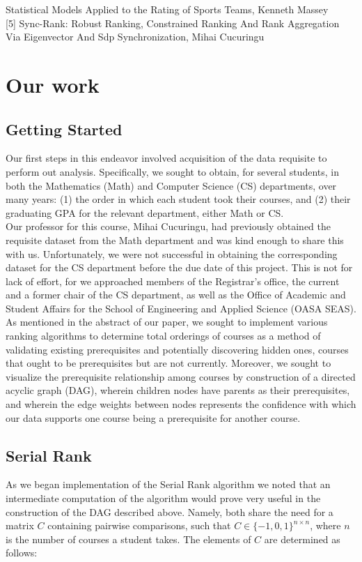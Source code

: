 \documentclass[10pt]{siamltex}
\begin{document}
\begin{pagewiselinenumbers}
[4] Statistical Models Applied to the Rating of Sports Teams, Kenneth Massey\\

[5] Sync-Rank: Robust Ranking, Constrained Ranking And Rank Aggregation Via Eigenvector And Sdp Synchronization, Mihai Cucuringu

\section{Our work}    \label{sec:ourWork}
\subsection{Getting Started}
Our first steps in this endeavor involved acquisition of the data requisite to perform out analysis. Specifically, we sought to obtain, for several students, in both the Mathematics (Math) and Computer Science (CS) departments, over many years: (1) the order in which each student took their courses, and (2) their graduating GPA for the relevant department, either Math or CS.\\

Our professor for this course, Mihai Cucuringu, had previously obtained the requisite dataset from the Math department and was kind enough to share this with us. Unfortunately, we were not successful in obtaining the corresponding dataset for the CS department before the due date of this project. This is not for lack of effort, for we approached members of the Registrar's office, the current and a former chair of the CS department, as well as the Office of Academic and Student Affairs for the School of Engineering and Applied Science (OASA SEAS).\\

As mentioned in the abstract of our paper, we sought to implement various ranking algorithms to determine total orderings of courses as a method of validating existing prerequisites and potentially discovering hidden ones, courses that ought to be prerequisites but are not currently. Moreover, we sought to visualize the prerequisite relationship among courses by construction of a directed acyclic graph (DAG), wherein children nodes have parents as their prerequisites, and wherein the edge weights between nodes represents the confidence with which our data supports one course being a prerequisite for another course. \\

\subsection{Serial Rank}
As we began implementation of the Serial Rank algorithm we noted that an intermediate computation of the algorithm would prove very useful in the construction of the DAG described above. Namely, both share the need for a matrix $C$ containing pairwise comparisons, such that $C\in \{-1,0,1\}^{n\times n}$, where $n$ is the number of courses a student takes. The elements of $C$ are determined as follows:


\end{pagewiselinenumbers}
\end{document}
